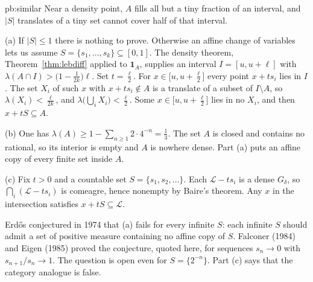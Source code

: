\begin{solution}{pb:similar}
\idea Near a density point, $A$ fills all but a tiny fraction of an interval, and $|S|$ translates of a tiny set cannot cover half of that interval.

\writeup (a) If $|S|\le 1$ there is nothing to prove. Otherwise an affine change of variables lets us assume $S=\{s_1,\dots,s_k\}\subseteq[0,1]$. The density theorem, Theorem~\ref{thm:lebdiff} applied to $\mathbf 1_A$, supplies an interval $I=[u,u+\ell]$ with $\lambda(A\cap I)>\bigl(1-\frac1{2k}\bigr)\ell$. Set $t=\frac\ell 2$. For $x\in\bigl[u,u+\frac\ell 2\bigr]$ every point $x+ts_i$ lies in $I$. The set $X_i$ of such $x$ with $x+ts_i\notin A$ is a translate of a subset of $I\setminus A$, so $\lambda(X_i)<\frac\ell{2k}$, and $\lambda\bigl(\bigcup_i X_i\bigr)<\frac\ell 2$. Some $x\in\bigl[u,u+\frac\ell 2\bigr]$ lies in no $X_i$, and then $x+tS\subseteq A$.

(b) One has $\lambda(A)\ge 1-\sum_{n\ge 1}2\cdot 4^{-n}=\frac13$. The set $A$ is closed and contains no rational, so its interior is empty and $A$ is nowhere dense. Part (a) puts an affine copy of every finite set inside $A$.

(c) Fix $t>0$ and a countable set $S=\{s_1,s_2,\dots\}$. Each $\mathcal L-ts_i$ is a dense $G_\delta$, so $\bigcap_i(\mathcal L-ts_i)$ is comeagre, hence nonempty by Baire's theorem. Any $x$ in the intersection satisfies $x+tS\subseteq\mathcal L$.

\leads Erdős conjectured in 1974 that (a) fails for every infinite $S$: each infinite $S$ should admit a set of positive measure containing no affine copy of $S$. Falconer (1984) and Eigen (1985) proved the conjecture, quoted here, for sequences $s_n\to 0$ with $s_{n+1}/s_n\to 1$. The question is open even for $S=\{2^{-n}\}$. Part (c) says that the category analogue is false.
\end{solution}


